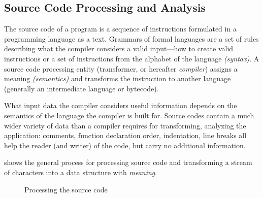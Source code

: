 \subsection{Source Code Processing and Analysis}
\label{sect:source-code-processing}
The source code of a program is a sequence of instructions formulated in a programming language as a text. Grammars of formal languages are a set of rules describing what the compiler considers a valid input---how to create valid instructions or a set of instructions from the alphabet of the language \emph{(syntax)}. A source code processing entity (transformer, or hereafter \emph{compiler}) assigns a meaning \emph{(semantics)} and transforms the instruction to another language (generally an intermediate language or bytecode).

What input data the compiler considers useful information depends on the semantics of the language the compiler is built for. Source codes contain a much wider variety of data than a compiler requires for transforming, analyzing the application: comments, function declaration order, indentation, line breaks all help the reader (and writer) of the code, but carry no additional information.

 shows the general process for processing source code and transforming a stream of characters into a data structure with \emph{meaning}.

\begin{figure}[!ht]
	\centering
	 {
	}
	\caption{Processing the source code}
	\label{fig:processing-the-source-code}
\end{figure}

